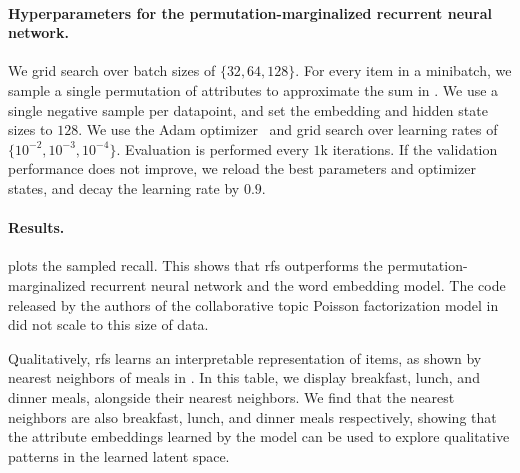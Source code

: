 
\paragraph{Hyperparameters for the permutation-marginalized recurrent neural
  network.} We grid search over batch sizes of $\{32, 64, 128\}$. For every item
in a minibatch, we sample a single permutation of attributes to approximate the
sum in . We use a single negative sample per datapoint, and set
the embedding and hidden state sizes to $128$. We use the Adam
optimizer~\citep{kingma2015adam:} and grid search over learning rates of
$\{10^{-2}, 10^{-3}, 10^{-4}\}$. Evaluation is performed every $1$k iterations.
If the validation performance does not improve, we reload the best parameters
and optimizer states, and decay the learning rate by $0.9$.

\paragraph{Results.}  plots the sampled recall. This shows
that \gls{rfs} outperforms the permutation-marginalized recurrent neural network
and the word embedding model. The code released by the authors of the
collaborative topic Poisson factorization model
in~\cite{gopalan2014content-based} did not scale to this size of data.

Qualitatively, \gls{rfs} learns an interpretable representation of
items, as shown by nearest neighbors of meals in . In
this table, we display breakfast, lunch, and dinner meals, alongside their
nearest neighbors. We find that the nearest neighbors are also breakfast, lunch,
and dinner meals respectively, showing that the attribute embeddings learned by
the model can be used to explore qualitative patterns in the learned latent
space.

